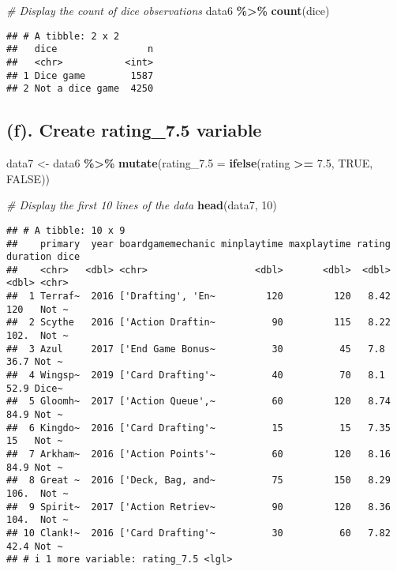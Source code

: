\documentclass[
]{article}
\newenvironment{Shaded}{\begin{snugshade}}{\end{snugshade}}
\newcommand{\AttributeTok}[1]{\textcolor[rgb]{0.13,0.29,0.53}{#1}}
\newcommand{\CommentTok}[1]{\textcolor[rgb]{0.56,0.35,0.01}{\textit{#1}}}
\newcommand{\ConstantTok}[1]{\textcolor[rgb]{0.56,0.35,0.01}{#1}}
\newcommand{\DecValTok}[1]{\textcolor[rgb]{0.00,0.00,0.81}{#1}}
\newcommand{\FloatTok}[1]{\textcolor[rgb]{0.00,0.00,0.81}{#1}}
\newcommand{\FunctionTok}[1]{\textcolor[rgb]{0.13,0.29,0.53}{\textbf{#1}}}
\newcommand{\NormalTok}[1]{#1}
\newcommand{\OtherTok}[1]{\textcolor[rgb]{0.56,0.35,0.01}{#1}}
\newcommand{\SpecialCharTok}[1]{\textcolor[rgb]{0.81,0.36,0.00}{\textbf{#1}}}
\begin{document}
\begin{Shaded}
\begin{Highlighting}[]
\CommentTok{\# Display the count of dice observations}
\NormalTok{data6 }\SpecialCharTok{\%\textgreater{}\%} \FunctionTok{count}\NormalTok{(dice)}
\end{Highlighting}
\end{Shaded}

\begin{verbatim}
## # A tibble: 2 x 2
##   dice                n
##   <chr>           <int>
## 1 Dice game        1587
## 2 Not a dice game  4250
\end{verbatim}

\hypertarget{f.-create-rating_7.5-variable}{%
\subsection{\texorpdfstring{(f). Create \textbf{rating\_7.5} variable}{(f). Create rating\_7.5 variable}}\label{f.-create-rating_7.5-variable}}

\begin{Shaded}
\begin{Highlighting}[]
\NormalTok{data7 }\OtherTok{\textless{}{-}}\NormalTok{ data6 }\SpecialCharTok{\%\textgreater{}\%}
  \FunctionTok{mutate}\NormalTok{(}\AttributeTok{rating\_7.5 =} \FunctionTok{ifelse}\NormalTok{(rating }\SpecialCharTok{\textgreater{}=} \FloatTok{7.5}\NormalTok{, }\ConstantTok{TRUE}\NormalTok{, }\ConstantTok{FALSE}\NormalTok{))}

\CommentTok{\# Display the first 10 lines of the data}
\FunctionTok{head}\NormalTok{(data7, }\DecValTok{10}\NormalTok{)}
\end{Highlighting}
\end{Shaded}

\begin{verbatim}
## # A tibble: 10 x 9
##    primary  year boardgamemechanic minplaytime maxplaytime rating duration dice 
##    <chr>   <dbl> <chr>                   <dbl>       <dbl>  <dbl>    <dbl> <chr>
##  1 Terraf~  2016 ['Drafting', 'En~         120         120   8.42    120   Not ~
##  2 Scythe   2016 ['Action Draftin~          90         115   8.22    102.  Not ~
##  3 Azul     2017 ['End Game Bonus~          30          45   7.8      36.7 Not ~
##  4 Wingsp~  2019 ['Card Drafting'~          40          70   8.1      52.9 Dice~
##  5 Gloomh~  2017 ['Action Queue',~          60         120   8.74     84.9 Not ~
##  6 Kingdo~  2016 ['Card Drafting'~          15          15   7.35     15   Not ~
##  7 Arkham~  2016 ['Action Points'~          60         120   8.16     84.9 Not ~
##  8 Great ~  2016 ['Deck, Bag, and~          75         150   8.29    106.  Not ~
##  9 Spirit~  2017 ['Action Retriev~          90         120   8.36    104.  Not ~
## 10 Clank!~  2016 ['Card Drafting'~          30          60   7.82     42.4 Not ~
## # i 1 more variable: rating_7.5 <lgl>
\end{verbatim}
\end{document}
